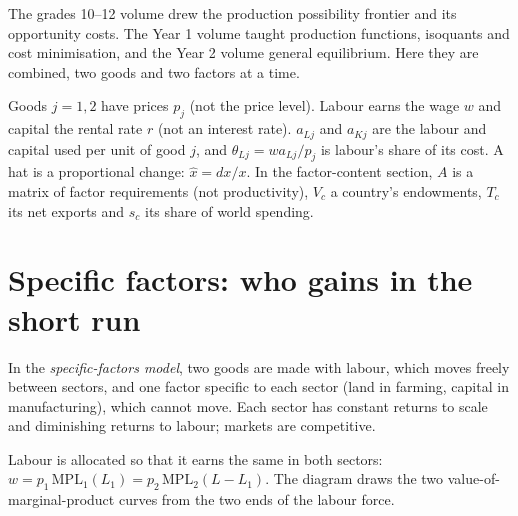 \begin{recall}
The grades 10--12 volume drew the production possibility frontier and its
opportunity costs. The Year 1 volume taught production functions, isoquants and
cost minimisation, and the Year 2 volume general equilibrium. Here they are
combined, two goods and two factors at a time.
\end{recall}

\begin{notation}\label{not:b3:factor-endowments:symbols}
Goods $j = 1, 2$ have prices $p_j$ (not the price level). Labour earns the wage
$w$ and capital the rental rate $r$ (not an interest rate). $a_{Lj}$ and $a_{Kj}$
are the labour and capital used per unit of good $j$, and $\theta_{Lj} = w
a_{Lj}/p_j$ is labour's share of its cost. A hat is a proportional change:
$\hat x = dx/x$. In the factor-content section, $A$ is a matrix of factor
requirements (not productivity), $V_c$ a country's endowments, $T_c$ its net
exports and $s_c$ its share of world spending.
\end{notation}

\section{Specific factors: who gains in the short run}\label{sec:b3:factor-endowments:specific}

\begin{definition}\label{def:b3:factor-endowments:specific-factors}
In the \emph{specific-factors model}, two goods are made with labour, which moves
freely between sectors, and one factor specific to each sector (land in farming,
capital in manufacturing), which cannot move. Each sector has constant returns
to scale and diminishing returns to labour; markets are competitive.
\end{definition}

Labour is allocated so that it earns the same in both sectors: $w = p_1\,
\mathrm{MPL}_1(L_1) = p_2\, \mathrm{MPL}_2(L - L_1)$. The diagram draws the two
value-of-marginal-product curves from the two ends of the labour force.

